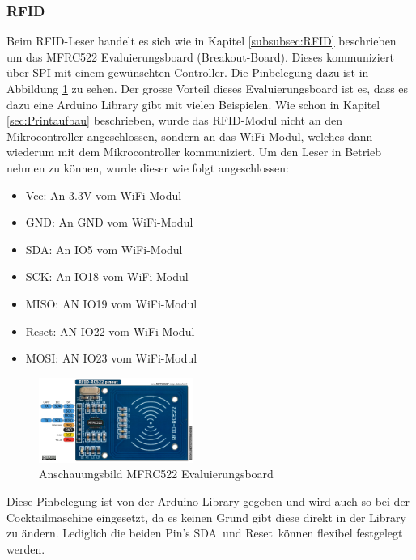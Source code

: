 \subsubsection{RFID}
\label{subsubsec:Inbetriebnahme_RFID}

Beim RFID-Leser handelt es sich wie in Kapitel \ref{subsubsec:RFID} beschrieben um das MFRC522 Evaluierungsboard (Breakout-Board). Dieses kommuniziert über SPI mit einem gewünschten Controller. Die Pinbelegung dazu ist in Abbildung \ref{fig:MFRC522} zu sehen. Der grosse Vorteil dieses Evaluierungsboard ist es, dass es dazu eine Arduino Library gibt mit vielen Beispielen. Wie schon in Kapitel \ref{sec:Printaufbau} beschrieben, wurde das RFID-Modul nicht an den Mikrocontroller angeschlossen, sondern an das WiFi-Modul, welches dann wiederum mit dem Mikrocontroller kommuniziert. Um den Leser in Betrieb nehmen zu können, wurde dieser wie folgt angeschlossen:


\begin{itemize}
\item Vcc: An 3.3V vom WiFi-Modul
\item GND: An GND vom WiFi-Modul
\item SDA: An IO5 vom WiFi-Modul
\item SCK: An IO18 vom WiFi-Modul
\item MISO: AN IO19 vom WiFi-Modul
\item Reset: AN IO22 vom WiFi-Modul
\item MOSI: AN IO23 vom WiFi-Modul
\end{itemize}

\begin{figure}[h!]
\center
\includegraphics[width = 0.45\textwidth]{graphics/MFRC522}
\caption{Anschauungsbild MFRC522 Evaluierungsboard \cite{nxp_bv_2010_antenna_2010}}
\label{fig:MFRC522}
\end{figure}

Diese Pinbelegung ist von der Arduino-Library gegeben und wird auch so bei der Cocktailmaschine eingesetzt, da es keinen Grund gibt diese direkt in der Library zu ändern. Lediglich die beiden Pin's \flqq SDA\frqq~und \flqq Reset\frqq~können flexibel festgelegt werden.

